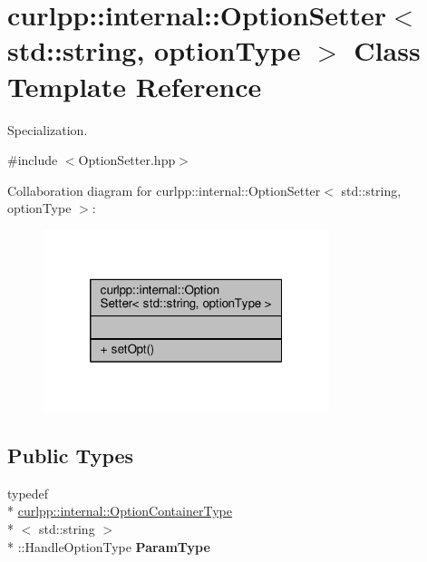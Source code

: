 \hypertarget{classcurlpp_1_1internal_1_1OptionSetter_3_01std_1_1string_00_01optionType_01_4}{\section{curlpp\-:\-:internal\-:\-:Option\-Setter$<$ std\-:\-:string, option\-Type $>$ Class Template Reference}
\label{classcurlpp_1_1internal_1_1OptionSetter_3_01std_1_1string_00_01optionType_01_4}
}


Specialization.  




{\ttfamily \#include $<$Option\-Setter.\-hpp$>$}



Collaboration diagram for curlpp\-:\-:internal\-:\-:Option\-Setter$<$ std\-:\-:string, option\-Type $>$\-:
\nopagebreak
\begin{figure}[H]
\begin{center}
\leavevmode
\includegraphics[width=236pt]{classcurlpp_1_1internal_1_1OptionSetter_3_01std_1_1string_00_01optionType_01_4__coll__graph}
\end{center}
\end{figure}
\subsection*{Public Types}
\begin{DoxyCompactItemize}
\item 
\hypertarget{classcurlpp_1_1internal_1_1OptionSetter_3_01std_1_1string_00_01optionType_01_4_ab4068e8bc5df3632d0f57da2e6318f6b}{typedef \\*
\hyperlink{structcurlpp_1_1internal_1_1OptionContainerType}{curlpp\-::internal\-::\-Option\-Container\-Type}\\*
$<$ std\-::string $>$\\*
\-::Handle\-Option\-Type {\bfseries Param\-Type}}\label{classcurlpp_1_1internal_1_1OptionSetter_3_01std_1_1string_00_01optionType_01_4_ab4068e8bc5df3632d0f57da2e6318f6b}

\end{DoxyCompactItemize}
